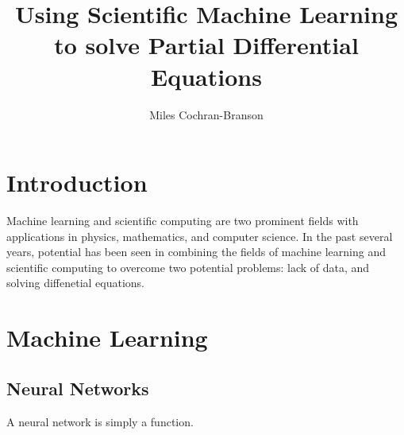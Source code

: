 \documentclass{CUP-JNL-DTM}%
\theoremstyle{definition}
\numberwithin{equation}{section}
\begin{document}
\begin{Frontmatter}

\title[Article Title]{Using Scientific Machine Learning to solve Partial Differential Equations}

\author[1]{Miles Cochran-Branson}


\address[1]{, , }%




\end{Frontmatter}

\localtableofcontents


\section{Introduction}

Machine learning and scientific computing are two prominent fields with applications in physics, mathematics, and computer science. In the past several years, potential has been seen in combining the fields of machine learning and scientific computing to overcome two potential problems: lack of data, and solving diffenetial equations. \cite{karniadakisPhysicsinformedMachineLearning2021}

\section{Machine Learning}


\subsection{Neural Networks}

A neural network is simply a function. 
\end{document}
